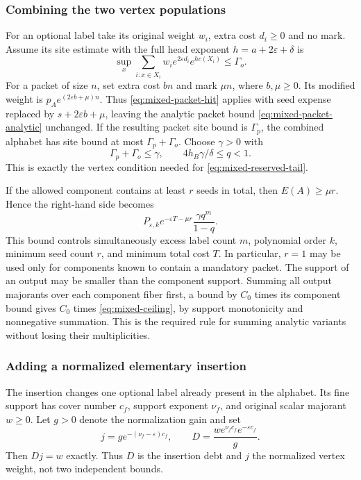 \subsubsection{Combining the two vertex populations}
For an optional label take its original weight $w_i$, extra cost
$d_i\ge0$ and no mark. Assume its site estimate with the full head
exponent $h=a+2\varepsilon+\delta$ is
\[
        \sup_x\sum_{i:x\in X_i}
             w_i e^{2\varepsilon d_i}e^{h c(X_i)}\le\Gamma_o.
\]
For a packet of size $n$, set extra cost $bn$ and mark $\mu n$,
where $b,\mu\ge0$. Its modified weight is
$p_Ae^{(2\varepsilon b+\mu)n}$. Thus
\eqref{eq:mixed-packet-hit} applies with seed expense replaced by
$s+2\varepsilon b+\mu$, leaving the analytic packet bound
\eqref{eq:mixed-packet-analytic} unchanged. If the resulting packet
site bound is $\Gamma_p$, the combined alphabet has site bound at
most $\Gamma_p+\Gamma_o$. Choose $\gamma>0$ with
\[
               \Gamma_p+\Gamma_o\le\gamma,
                       \qquad 4h_B\gamma/\delta\le q<1.
\]
This is exactly the vertex condition needed for
\eqref{eq:mixed-reserved-tail}.

If the allowed component contains at least $r$ seeds in total,
then $E(A)\ge\mu r$. Hence the right-hand side becomes
\begin{equation}\label{eq:mixed-ceiling}
       P_{\varepsilon,k}e^{-\varepsilon T-\mu r}
                                \frac{\gamma q^m}{1-q}.
\end{equation}
This bound controls simultaneously excess label count $m$, polynomial
order $k$, minimum seed count $r$, and minimum total cost $T$.
In particular, $r=1$ may be used only for components known to contain
a mandatory packet. The support of an output may be smaller than
the component support. Summing all output majorants over each
component fiber first, a bound by $C_0$ times its component bound
gives $C_0$ times \eqref{eq:mixed-ceiling}, by support monotonicity
and nonnegative summation. This is the required rule for summing
analytic variants without losing their multiplicities.

\subsubsection{Adding a normalized elementary insertion}
The insertion changes one optional label already present in the
alphabet. Its fine support has cover number $c_f$, support exponent
$\nu_f$, and original scalar majorant $w\ge0$. Let $g>0$ denote
the normalization gain and set
\[
             j=g e^{-(\nu_f-\varepsilon)c_f},\qquad
             D=\frac{w e^{\nu_f c_f}e^{-\varepsilon c_f}}g.
\]
Then $Dj=w$ exactly. Thus $D$ is the insertion debt and $j$ the
normalized vertex weight, not two independent bounds.

